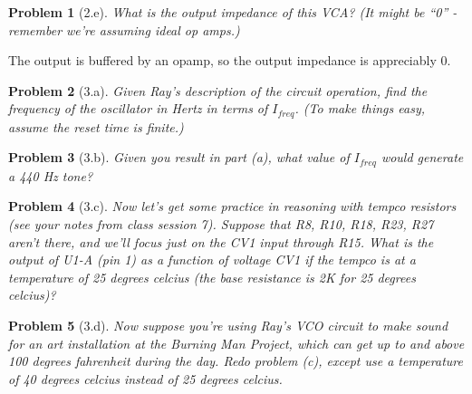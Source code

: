 \documentclass[12pt]{article}
\newtheorem*{prob}{Problem}
\begin{document}
\begin{prob}[2.e]{
What is the output impedance of this VCA? (It might be ``0'' - remember we're assuming ideal op amps.)
}\end{prob}
The output is buffered by an opamp, so the output impedance is appreciably $0$.
\begin{prob}[3.a]{
Given Ray's description of the circuit operation, find the frequency of the oscillator in Hertz in terms of $I_{freq}$. (To make things easy, assume the reset time is finite.)
}\end{prob}

\begin{prob}[3.b]{
Given you result in part (a), what value of $I_{freq}$ would generate a 440 Hz tone?
}\end{prob}

\begin{prob}[3.c]{
Now let's get some practice in reasoning with tempco resistors (see your notes from class session 7). Suppose that R8, R10, R18, R23, R27 aren't there, and we'll focus just on the CV1 input through R15. What is the output of U1-A (pin 1) as a function of voltage CV1 if the tempco is at a temperature of 25 degrees celcius (the base resistance is 2K for 25 degrees celcius)?
}\end{prob}

\begin{prob}[3.d]{
Now suppose you're using Ray's VCO circuit to make sound for an art installation at the Burning Man Project, which can get up to and above 100 degrees fahrenheit during the day. Redo problem (c), except use a temperature of 40 degrees celcius instead of 25 degrees celcius.
}\end{prob}
\end{document}
